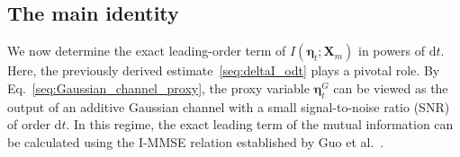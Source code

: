 \documentclass[
 longbibliography,
 twocolumn,
 superscriptaddress,
 amsmath,
 amssymb,
 amsthm,
 amsfonts,
 prl,
 floatfix,
]{revtex4-2}
\newcommand{\matbf}[1]{\boldsymbol{\mathsf{#1}}}
\begin{document}
\begin{widetext}

\subsection{The main identity}
\vspace*{-0.6\baselineskip}

We now determine the exact leading-order term of $I(\bm\eta_t;\bm X_m)$ in powers of $\mathrm dt$. Here, the previously derived estimate~\eqref{seq:deltaI_odt} plays a pivotal role. By Eq.~\eqref{seq:Gaussian_channel_proxy}, the proxy variable $\bm\eta_t^G$ can be viewed as the output of an additive Gaussian channel with a small signal-to-noise ratio (SNR) of order $\mathrm{d}t$. In this regime, the exact leading term of the mutual information can be calculated using the I-MMSE relation established by Guo et al.~\cite{guo2005mutual}.


\end{widetext}
\end{document}
